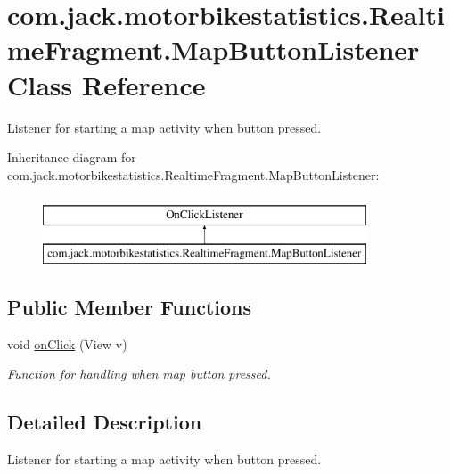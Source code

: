 \hypertarget{classcom_1_1jack_1_1motorbikestatistics_1_1_realtime_fragment_1_1_map_button_listener}{}\section{com.\+jack.\+motorbikestatistics.\+Realtime\+Fragment.\+Map\+Button\+Listener Class Reference}
\label{classcom_1_1jack_1_1motorbikestatistics_1_1_realtime_fragment_1_1_map_button_listener}


Listener for starting a map activity when button pressed.  


Inheritance diagram for com.\+jack.\+motorbikestatistics.\+Realtime\+Fragment.\+Map\+Button\+Listener\+:\begin{figure}[H]
\begin{center}
\leavevmode
\includegraphics[height=2.000000cm]{classcom_1_1jack_1_1motorbikestatistics_1_1_realtime_fragment_1_1_map_button_listener}
\end{center}
\end{figure}
\subsection*{Public Member Functions}
\begin{DoxyCompactItemize}
\item 
void \hyperlink{classcom_1_1jack_1_1motorbikestatistics_1_1_realtime_fragment_1_1_map_button_listener_a6d7946385193fabf809155132ea721de}{on\+Click} (View v)
\begin{DoxyCompactList}\small\item\em Function for handling when map button pressed. \end{DoxyCompactList}\end{DoxyCompactItemize}


\subsection{Detailed Description}
Listener for starting a map activity when button pressed. 

